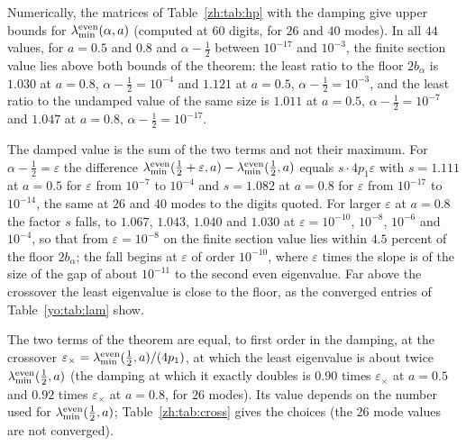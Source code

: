 Numerically, the matrices of Table~\ref{zh:tab:hp} with the damping give upper bounds for $\lambda_{\min}^{\rm even}(\alpha,a)$ (computed at $60$ digits, for $26$ and $40$ modes). In all $44$ values, for $a=0.5$ and $0.8$ and $\alpha-\frac12$ between $10^{-17}$ and $10^{-3}$, the finite section value lies above both bounds of the theorem: the least ratio to the floor $2b_\alpha$ is $1.030$ at $a=0.8$, $\alpha-\frac12=10^{-4}$ and $1.121$ at $a=0.5$, $\alpha-\frac12=10^{-3}$, and the least ratio to the undamped value of the same size is $1.011$ at $a=0.5$, $\alpha-\frac12=10^{-7}$ and $1.047$ at $a=0.8$, $\alpha-\frac12=10^{-17}$.

The damped value is the sum of the two terms and not their maximum. For $\alpha-\frac12=\varepsilon$ the difference $\lambda_{\min}^{\rm even}(\frac12+\varepsilon,a)-\lambda_{\min}^{\rm even}(\frac12,a)$ equals $s\cdot4p_1\varepsilon$ with $s=1.111$ at $a=0.5$ for $\varepsilon$ from $10^{-7}$ to $10^{-4}$ and $s=1.082$ at $a=0.8$ for $\varepsilon$ from $10^{-17}$ to $10^{-14}$, the same at $26$ and $40$ modes to the digits quoted. For larger $\varepsilon$ at $a=0.8$ the factor $s$ falls, to $1.067$, $1.043$, $1.040$ and $1.030$ at $\varepsilon=10^{-10}$, $10^{-8}$, $10^{-6}$ and $10^{-4}$, so that from $\varepsilon=10^{-8}$ on the finite section value lies within $4.5$ percent of the floor $2b_\alpha$; the fall begins at $\varepsilon$ of order $10^{-10}$, where $\varepsilon$ times the slope is of the size of the gap of about $10^{-11}$ to the second even eigenvalue. Far above the crossover the least eigenvalue is close to the floor, as the converged entries of Table~\ref{yo:tab:lam} show.

The two terms of the theorem are equal, to first order in the damping, at the crossover $\varepsilon_\times=\lambda_{\min}^{\rm even}(\frac12,a)/(4p_1)$, at which the least eigenvalue is about twice $\lambda_{\min}^{\rm even}(\frac12,a)$ (the damping at which it exactly doubles is $0.90$ times $\varepsilon_\times$ at $a=0.5$ and $0.92$ times $\varepsilon_\times$ at $a=0.8$, for $26$ modes). Its value depends on the number used for $\lambda_{\min}^{\rm even}(\frac12,a)$; Table~\ref{zh:tab:cross} gives the choices (the $26$ mode values are not converged).


